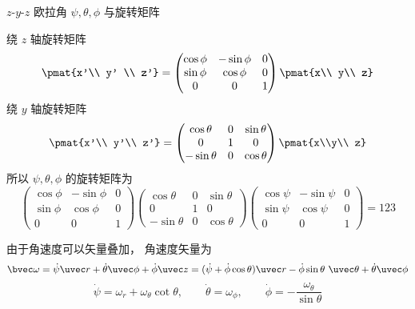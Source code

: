 
\begin{issues}
\issueDraft
\end{issues}

$z$-$y$-$z$ 欧拉角 $\psi,\theta,\phi$ 与旋转矩阵

绕 $z$ 轴旋转矩阵
\begin{equation}
\pmat{x'\\ y' \\ z'} =
\begin{pmatrix}
\cos\phi & - \sin\phi & 0\\
\sin\phi &\cos\phi & 0\\
0 & 0 & 1
\end{pmatrix}\pmat{x\\ y\\ z}
\end{equation}
绕 $y$ 轴旋转矩阵
\begin{equation}
\pmat{x'\\ y'\\ z'} =
\begin{pmatrix}
\cos\theta & 0 & \sin\theta\\
0 & 1 & 0\\
-\sin\theta & 0 & \cos\theta
\end{pmatrix}\pmat{x\\y\\ z}
\end{equation}
所以 $\psi,\theta,\phi$ 的旋转矩阵为
\begin{equation}
\begin{pmatrix}
\cos\phi & - \sin\phi & 0\\
\sin\phi &\cos\phi & 0\\
0 & 0 & 1
\end{pmatrix}
\begin{pmatrix}
\cos\theta & 0 & \sin\theta\\
0 & 1 & 0\\
-\sin\theta & 0 & \cos\theta
\end{pmatrix}
\begin{pmatrix}
\cos\psi & - \sin\psi & 0\\
\sin\psi &\cos\psi & 0\\
0 & 0 & 1
\end{pmatrix}
=
123
\end{equation}



由于角速度可以矢量叠加， 角速度矢量为
\begin{equation}
\bvec\omega
= \dot\psi\uvec r + \dot\theta\uvec\phi + \dot\phi\uvec z
= (\dot\psi + \dot\phi\cos\theta)\uvec r - \dot\phi\sin\theta\ \uvec\theta +
 \dot\theta\uvec\phi
\end{equation}
\begin{equation}
\dot\psi = \omega_r + \omega_\theta \cot\theta,\qquad
\dot\theta = \omega_\phi,\qquad
\dot\phi = -\frac{\omega_\theta}{\sin\theta}
\end{equation}

